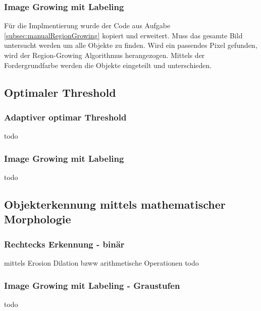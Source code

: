 \documentclass[12pt,german]{article}
\begin{document}
\begin{landscape}

\end{landscape}


\subsubsection{Image Growing mit Labeling}
Für die Implmentierung wurde der Code aus Aufgabe \ref{subsec:manualRegionGrowing} kopiert und erweitert. Muss das gesamte Bild untersucht werden um alle Objekte zu finden. Wird ein passendes Pixel gefunden, wird der Region-Growing Algorithmus herangezogen. Mittels der Fordergrundfarbe werden die Objekte eingeteilt und unterschieden.

\begin{landscape}

\end{landscape}


\subsection{Optimaler Threshold}

\subsubsection{Adaptiver optimar Threshold}
todo

\subsubsection{Image Growing mit Labeling}
todo


\subsection{Objekterkennung mittels mathematischer Morphologie}

\subsubsection{Rechtecks Erkennung - binär}
mittels Erosion Dilation
bzww
arithmetische Operationen
todo

\subsubsection{Image Growing mit Labeling - Graustufen}
todo
\end{document}
